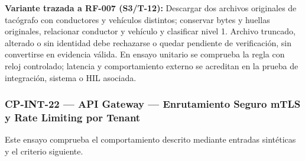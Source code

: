 \par\noindent\textbf{Variante trazada a RF-007 (S3/T-12):} Descargar dos archivos originales de tacógrafo con conductores y vehículos distintos; conservar bytes y huellas originales, relacionar conductor y vehículo y clasificar nivel 1. Archivo truncado, alterado o sin identidad debe rechazarse o quedar pendiente de verificación, sin convertirse en evidencia válida. En ensayo unitario se comprueba la regla con reloj controlado; latencia y comportamiento externo se acreditan en la prueba de integración, sistema o HIL asociada.\par
\subsubsection*{CP-INT-22 — API Gateway — Enrutamiento Seguro mTLS y Rate Limiting por Tenant}\label{sec:9-cp-int-22}
Este ensayo comprueba el comportamiento descrito mediante entradas sintéticas y el criterio siguiente.

